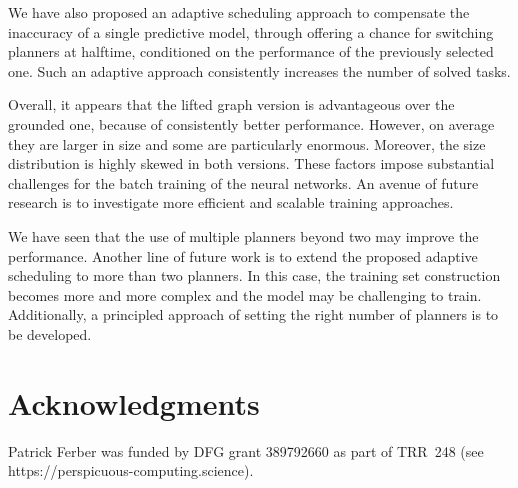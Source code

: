 \documentclass[letterpaper]{article} %
\begin{document}
We have also proposed an adaptive scheduling approach to compensate the inaccuracy of a single predictive model, through offering a  chance for switching planners at halftime, conditioned on the performance of the previously selected one. Such an adaptive approach consistently increases the number of solved tasks.

Overall, it appears that the lifted graph version is advantageous over the grounded one, because of consistently better performance. However, on average they are larger in size and some are particularly enormous. Moreover, the size distribution is highly skewed in both versions. These factors impose substantial challenges for the batch training of the neural networks. An avenue of future research is to investigate more efficient and scalable training approaches.

We have seen that the use of multiple planners beyond two may improve the performance. Another line of future work is to extend the proposed adaptive scheduling to more than two planners. In this case, the training set construction becomes more and more complex and the model may be challenging to train. Additionally, a principled approach of setting the right number of planners is to be developed.


\section*{Acknowledgments}
Patrick Ferber was funded by DFG grant 389792660 as part of TRR~248 (see https://perspicuous-computing.science).


\fontsize{9.5pt}{10.5pt}\selectfont


\end{document}
